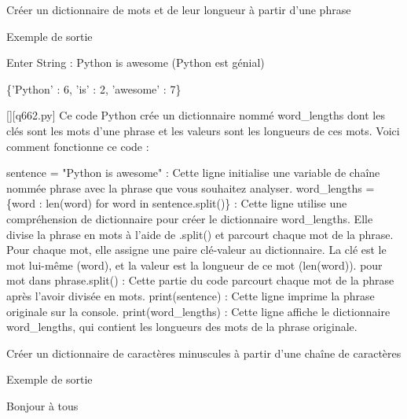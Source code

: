         \question
        Créer un dictionnaire de mots et de leur longueur à partir d'une phrase

Exemple de sortie

Enter String : Python is awesome (Python est génial)

\{'Python' : 6, 'is' : 2, 'awesome' : 7\}
        \par
        \begin{solution}
            \renewcommand{\nomfichier}{q662.py}
            \pythonfile{\chemincode \nomfichier}[][\nomfichier]
            Ce code Python crée un dictionnaire nommé word\_lengths dont les clés sont les mots d'une phrase et les valeurs sont les longueurs de ces mots. Voici comment fonctionne ce code :

    sentence = "Python is awesome" : Cette ligne initialise une variable de chaîne nommée phrase avec la phrase que vous souhaitez analyser.
    word\_lengths = \{word : len(word) for word in sentence.split()\} : Cette ligne utilise une compréhension de dictionnaire pour créer le dictionnaire word\_lengths. Elle divise la phrase en mots à l'aide de .split() et parcourt chaque mot de la phrase. Pour chaque mot, elle assigne une paire clé-valeur au dictionnaire. La clé est le mot lui-même (word), et la valeur est la longueur de ce mot (len(word)).
        pour mot dans phrase.split() : Cette partie du code parcourt chaque mot de la phrase après l'avoir divisée en mots.
    print(sentence) : Cette ligne imprime la phrase originale sur la console.
    print(word\_lengths) : Cette ligne affiche le dictionnaire word\_lengths, qui contient les longueurs des mots de la phrase originale.
        \end{solution}
        

        \question
        Créer un dictionnaire de caractères minuscules à partir d'une chaîne de caractères

Exemple de sortie

Bonjour à tous

